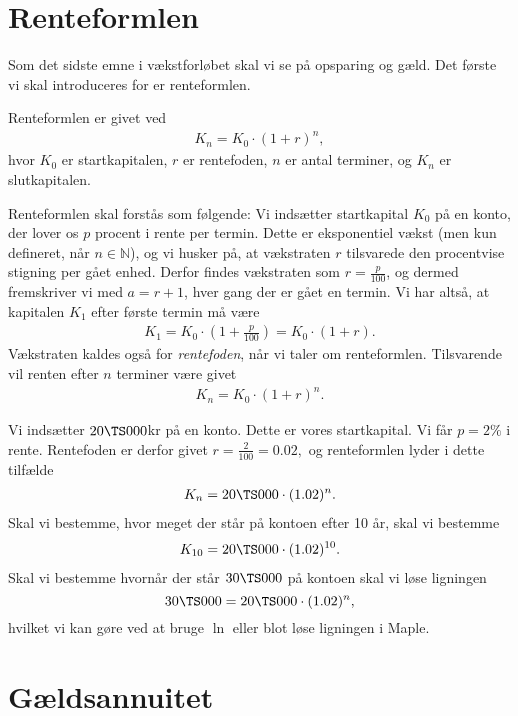 
\section*{Renteformlen}

Som det sidste emne i vækstforløbet skal vi se på opsparing og gæld. Det første vi skal introduceres for er renteformlen.
\begin{defn}
Renteformlen er givet ved 
\begin{align*}
K_n = K_0\cdot (1+r)^n, 
\end{align*}
hvor $K_0$ er startkapitalen, $r$ er rentefoden, $n$ er antal terminer, og $K_n$ er slutkapitalen. 
\end{defn}

Renteformlen skal forstås som følgende: Vi indsætter startkapital $K_0$ på en konto, der lover os $p$ procent i rente per termin. Dette er eksponentiel vækst (men kun defineret, når $n\in \mathbb{N}$), og vi husker på, at vækstraten $r$ tilsvarede den procentvise stigning per gået enhed. Derfor findes vækstraten som $r = \frac{p}{100}$, og dermed fremskriver vi med $a = r+1$, hver gang der er gået en termin. Vi har altså, at kapitalen $K_1$ efter første termin må være
\begin{align*}
K_1 = K_0\cdot (1+\frac{p}{100})   = K_0\cdot (1+r).
\end{align*}
Vækstraten kaldes også for \textit{rentefoden}, når vi taler om renteformlen. Tilsvarende vil renten efter $n$ terminer være givet
\begin{align*}
K_n = K_0\cdot (1+r)^n.
\end{align*}
\begin{exa}
Vi indsætter $20 \TS 000$kr på en konto. Dette er vores startkapital. Vi får $p=2\%$ i rente. Rentefoden er derfor givet $r = \frac{2}{100} = 0.02,$ og renteformlen lyder i dette tilfælde
\begin{align*}
K_n = 20 \TS 000\cdot (1.02)^n.
\end{align*}
Skal vi bestemme, hvor meget der står på kontoen efter 10 år, skal vi bestemme 
\begin{align*}
K_{10} = 20 \TS 000\cdot (1.02)^{10}.
\end{align*}
Skal vi bestemme hvornår der står $30 \TS 000$ på kontoen skal vi løse ligningen
\[
30 \TS 000 = 20 \TS 000\cdot (1.02)^n,
\]
hvilket vi kan gøre ved at bruge $\ln$ eller blot løse ligningen i Maple.
\end{exa}

\section*{Gældsannuitet}

